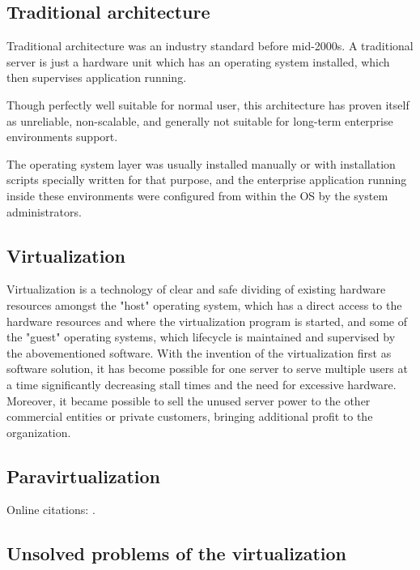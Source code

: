 \subsection{Traditional architecture}

Traditional architecture was an industry standard before mid-2000s.
A traditional server is just a hardware unit which has an operating system installed,
which then supervises application running.

Though perfectly well suitable for normal user, this architecture has proven itself as unreliable, non-scalable,
and generally not suitable for long-term enterprise environments support.

The operating system layer was usually installed manually or with installation scripts specially written for that purpose,
and the enterprise application running inside these environments were configured from within the OS by the system administrators.

\subsection{Virtualization}
Virtualization is a technology of clear and safe dividing
of existing hardware resources amongst the "host" operating system,
which has a direct access to the hardware resources and where the virtualization program is started, and some of the "guest" operating systems,
which lifecycle is maintained and supervised by the abovementioned software.
With the invention of the virtualization first as software solution,
it has become possible for one server to serve multiple users at a time significantly decreasing stall times and the need for excessive hardware.
Moreover, it became possible to sell the unused
server power to the other commercial entities or private customers,
bringing additional profit to the organization.



\subsection{Paravirtualization}


Online citations: \cite{TUGInstmem, Thornburg01, CTANacmart}.



\subsection{Unsolved problems of the virtualization}


